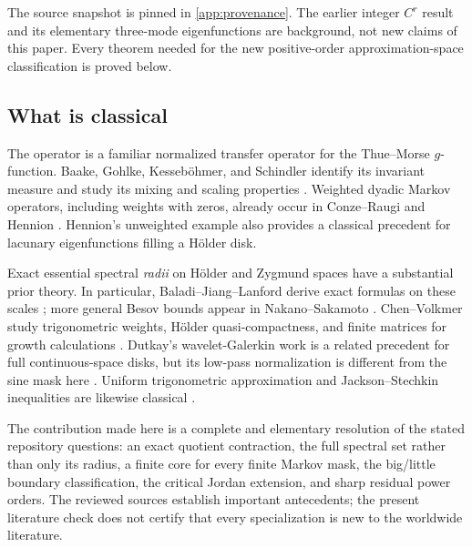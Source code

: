 \documentclass[11pt,a4paper]{article}
\numberwithin{equation}{section}
\theoremstyle{definition}
\theoremstyle{remark}
\begin{document}
The source snapshot is pinned in \cref{app:provenance}. The earlier
integer $C^r$ result and its elementary three-mode eigenfunctions are
background, not new claims of this paper. Every theorem needed for the
new positive-order approximation-space classification is proved below.

\subsection{What is classical}
The operator is a familiar normalized transfer operator for the
Thue--Morse $g$-function. Baake, Gohlke, Kesseb\"ohmer, and Schindler
identify its invariant measure and study its mixing and scaling
properties \cite{baake}. Weighted dyadic Markov operators, including
weights with zeros, already occur in Conze--Raugi and Hennion
\cite{conze,hennion95}. Hennion's unweighted example also provides a
classical precedent for lacunary eigenfunctions filling a H\"older disk.

Exact essential spectral \emph{radii} on H\"older and Zygmund spaces
have a substantial prior theory. In particular, Baladi--Jiang--Lanford
derive exact formulas on these scales \cite{bjl}; more general Besov
bounds appear in Nakano--Sakamoto \cite{nakano}. Chen--Volkmer study
trigonometric weights, H\"older quasi-compactness, and finite matrices
for growth calculations \cite{chen}. Dutkay's wavelet-Galerkin work is
a related precedent for full continuous-space disks, but its low-pass
normalization is different from the sine mask here \cite{dutkay}.
Uniform trigonometric approximation and Jackson--Stechkin inequalities
are likewise classical \cite{foucart,devore}.

The contribution made here is a complete and elementary resolution of
the stated repository questions: an exact quotient contraction, the full
spectral set rather than only its radius, a finite core for every finite
Markov mask, the big/little boundary classification, the critical Jordan
extension, and sharp residual power orders. The reviewed sources establish
important antecedents; the present literature check does not certify that
every specialization is new to the worldwide literature.
\end{document}
